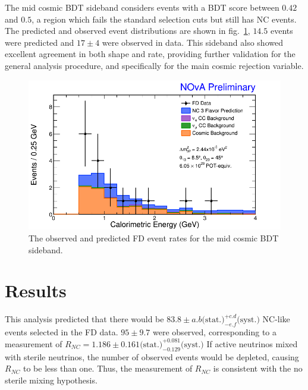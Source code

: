 The mid cosmic BDT sideband considers events with a BDT score between $0.42$ and $0.5$, a region which fails the standard selection cuts but still has NC events. The predicted and observed event distributions are shown in fig.~\ref{fig:SidebandMidBDT}, $14.5$ events were predicted and $17 \pm 4$ were observed in data. This sideband also showed excellent agreement in both shape and rate, providing further validation for the general analysis procedure, and specifically for the main cosmic rejection variable.
\begin{figure}[htbp]
  \centering
  \includegraphics[width=1\textwidth]{figures/Ana01Results/FDMidBDTCalEDataMCStack.png}
  \caption[Mid Cosmic BDT Sideband]{The observed and predicted FD event rates for the mid cosmic BDT sideband.}
  \label{fig:SidebandMidBDT}
\end{figure}

\section{Results}

This analysis predicted that there would be $83.8 \pm a.b \mbox{(stat.)} ^{+c.d}_{-e.f} \mbox{(syst.)}$ NC-like events selected in the FD data. $95 \pm 9.7$ were observed, corresponding to a measurement of $R_{NC} = 1.186 \pm 0.161 \mbox{(stat.)} ^{+0.081}_{-0.129} \mbox{(syst.)}$ If active neutrinos mixed with sterile neutrinos, the number of observed events would be depleted, causing $R_{NC}$ to be less than one. Thus, the measurement of $R_{NC}$ is consistent with the no sterile mixing hypothesis.

